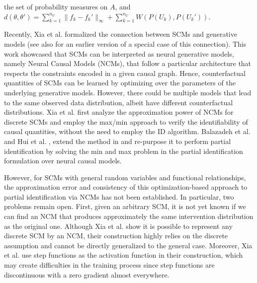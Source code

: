 \documentclass[12pt]{article}
\theoremstyle{plain}
\theoremstyle{definition}
\theoremstyle{remark}
\begin{document}
the set of probability measures on $A$, and $d(\theta,\theta')=\sum_{k=1}^{n_V}\|f_k-f_k'\|_\infty+\sum_{k=1}^{n_U}W(P(U_k),P(U_k'))$.


Recently, Xia et al. \cite{xiaCausalNeuralConnectionExpressiveness2022} formalized the connection between SCMs and generative models (see also \cite{kocaoglu2017causalgan} for an earlier version of a special case of this connection). This work showcased that SCMs can be interpreted as neural generative models, namely Neural Causal Models (NCMs), that follow a particular architecture that respects the constraints encoded in a given causal graph. Hence, counterfactual quantities of SCMs can be learned by optimizing over the parameters of the underlying generative models. However, there could be multiple models that lead to the same observed data distribution, albeit have different counterfactual distributions.  Xia et al. \cite{xiaCausalNeuralConnectionExpressiveness2022} first analyze the approximation power of NCMs for discrete SCMs and employ the max/min approach to verify the identifiability of causal quantities, without the need to employ the ID algorithm. Balazadeh et al. \cite{balazadehPartialIdentificationTreatment2022} and Hui et al. \cite{hu2021generative}, extend the method in \cite{xiaCausalNeuralConnectionExpressiveness2022} and re-purpose it to  perform partial identification by solving the min and max problem in the partial identification formulation over neural causal models. \par 

However, for SCMs with general random variables and functional relationships, the approximation error and consistency of this optimization-based approach to partial identification via NCMs has not been established. In particular, two problems remain open. First, given an arbitrary SCM, it is not yet known if we can find an NCM that produces approximately the same intervention distribution as the original one. Although Xia et al.\cite{xiaCausalNeuralConnectionExpressiveness2022} show it is possible to represent any discrete SCM by an NCM, their construction highly relies on the discrete assumption and cannot be directly generalized to the general case. Moreover, Xia et al. \cite{xiaCausalNeuralConnectionExpressiveness2022} use step functions as the activation function in their construction, which may create difficulties in the training process since step functions are discontinuous with a zero gradient almost everywhere.
\end{document}

